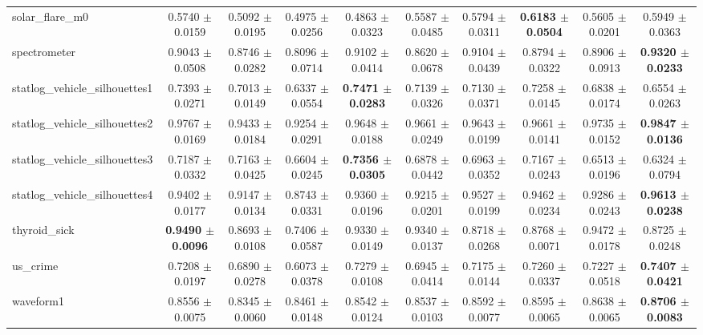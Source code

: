 \begin{table*}[htbp]
{\begin{tabular}{lccccccccc}
            solar\_flare\_m0 & 0.5740 $\pm$ 0.0159 & 0.5092 $\pm$ 0.0195 & 0.4975 $\pm$ 0.0256 & 0.4863 $\pm$ 0.0323 & 0.5587 $\pm$ 0.0485 & 0.5794 $\pm$ 0.0311 & \cellcolor{graybg}\textbf{0.6183 $\pm$ 0.0504} & 0.5605 $\pm$ 0.0201 & 0.5949 $\pm$ 0.0363 \\ 
            spectrometer & 0.9043 $\pm$ 0.0508 & 0.8746 $\pm$ 0.0282 & 0.8096 $\pm$ 0.0714 & 0.9102 $\pm$ 0.0414 & 0.8620 $\pm$ 0.0678 & 0.9104 $\pm$ 0.0439 & 0.8794 $\pm$ 0.0322 & 0.8906 $\pm$ 0.0913 & \cellcolor{graybg}\textbf{0.9320 $\pm$ 0.0233} \\ 
            statlog\_vehicle\_silhouettes1 & 0.7393 $\pm$ 0.0271 & 0.7013 $\pm$ 0.0149 & 0.6337 $\pm$ 0.0554 & \cellcolor{graybg}\textbf{0.7471 $\pm$ 0.0283} & 0.7139 $\pm$ 0.0326 & 0.7130 $\pm$ 0.0371 & 0.7258 $\pm$ 0.0145 & 0.6838 $\pm$ 0.0174 & 0.6554 $\pm$ 0.0263 \\ 
            statlog\_vehicle\_silhouettes2 & 0.9767 $\pm$ 0.0169 & 0.9433 $\pm$ 0.0184 & 0.9254 $\pm$ 0.0291 & 0.9648 $\pm$ 0.0188 & 0.9661 $\pm$ 0.0249 & 0.9643 $\pm$ 0.0199 & 0.9661 $\pm$ 0.0141 & 0.9735 $\pm$ 0.0152 & \cellcolor{graybg}\textbf{0.9847 $\pm$ 0.0136} \\ 
            statlog\_vehicle\_silhouettes3 & 0.7187 $\pm$ 0.0332 & 0.7163 $\pm$ 0.0425 & 0.6604 $\pm$ 0.0245 & \cellcolor{graybg}\textbf{0.7356 $\pm$ 0.0305} & 0.6878 $\pm$ 0.0442 & 0.6963 $\pm$ 0.0352 & 0.7167 $\pm$ 0.0243 & 0.6513 $\pm$ 0.0196 & 0.6324 $\pm$ 0.0794 \\ 
            statlog\_vehicle\_silhouettes4 & 0.9402 $\pm$ 0.0177 & 0.9147 $\pm$ 0.0134 & 0.8743 $\pm$ 0.0331 & 0.9360 $\pm$ 0.0196 & 0.9215 $\pm$ 0.0201 & 0.9527 $\pm$ 0.0199 & 0.9462 $\pm$ 0.0234 & 0.9286 $\pm$ 0.0243 & \cellcolor{graybg}\textbf{0.9613 $\pm$ 0.0238} \\ 
            thyroid\_sick & \cellcolor{graybg}\textbf{0.9490 $\pm$ 0.0096} & 0.8693 $\pm$ 0.0108 & 0.7406 $\pm$ 0.0587 & 0.9330 $\pm$ 0.0149 & 0.9340 $\pm$ 0.0137 & 0.8718 $\pm$ 0.0268 & 0.8768 $\pm$ 0.0071 & 0.9472 $\pm$ 0.0178 & 0.8725 $\pm$ 0.0248 \\ 
            us\_crime & 0.7208 $\pm$ 0.0197 & 0.6890 $\pm$ 0.0278 & 0.6073 $\pm$ 0.0378 & 0.7279 $\pm$ 0.0108 & 0.6945 $\pm$ 0.0414 & 0.7175 $\pm$ 0.0144 & 0.7260 $\pm$ 0.0337 & 0.7227 $\pm$ 0.0518 & \cellcolor{graybg}\textbf{0.7407 $\pm$ 0.0421} \\ 
            waveform1 & 0.8556 $\pm$ 0.0075 & 0.8345 $\pm$ 0.0060 & 0.8461 $\pm$ 0.0148 & 0.8542 $\pm$ 0.0124 & 0.8537 $\pm$ 0.0103 & 0.8592 $\pm$ 0.0077 & 0.8595 $\pm$ 0.0065 & 0.8638 $\pm$ 0.0065 & \cellcolor{graybg}\textbf{0.8706 $\pm$ 0.0083} \\ 

\end{tabular}}
\end{table*}
